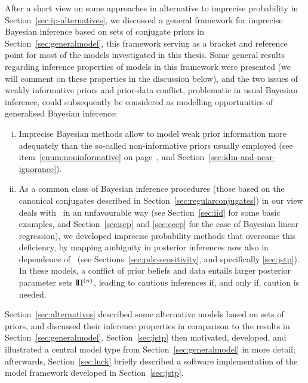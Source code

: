 After a short view on some approaches in alternative to imprecise probability in Section~\ref{sec:ip-alternatives},
we discussed a general framework for imprecise Bayesian inference
based on sets of conjugate priors in Section~\ref{sec:generalmodel},
this framework serving as a bracket and reference point for most of the models investigated in this thesis.
Some general results regarding inference properties of models
in this framework were presented (we will comment on these properties in the discussion below),
and the two issues of weakly informative priors and prior-data conflict,
problematic in usual Bayesian inference,
could subsequently be considered as modelling opportunities of generalised Bayesian inference:
\begin{enumerate}[(i)]
\item Imprecise Bayesian methods allow to model weak prior information
more adequately than the so-called non-informative priors usually employed 
(see item~\ref{enum:noninformative} on page~\pageref{enum:noninformative}, and Section~\ref{sec:idm-and-near-ignorance}).
\item As a common class of Bayesian inference procedures
(those based on the canonical conjugates described in Section~\ref{sec:regularconjugates})
in our view deals with \pdc\ in an unfavourable way %
(see Section~\ref{sec:iid} for some basic examples, and
Section~\ref{sec:scp} and \ref{sec:cccp} for the case of Bayesian linear regression),
we developed imprecise probability methods that overcome this deficiency,
by mapping ambiguity in posterior inferences now also in dependence of \pdc\ 
(see Sections~\ref{sec:pdc-sensitivity}, and specifically \ref{sec:jstp}).
In these models, a conflict of prior beliefs and data
entails larger posterior parameter sets $\text{I}\!\Pi^{(n)}$,
leading to cautious inferences if, and only if, caution is needed.
\end{enumerate}

Section~\ref{sec:alternatives} described some alternative models based on sets of priors,
and discussed their inference properties in comparison to the results in Section~\ref{sec:generalmodel}.
Section~\ref{sec:jstp} then motivated, developed, and illustrated
a central model type from Section~\ref{sec:generalmodel} in more detail;
afterwards, Section~\ref{sec:luck} briefly described a software implementation
of the model framework developed in Section~\ref{sec:jstp}.

